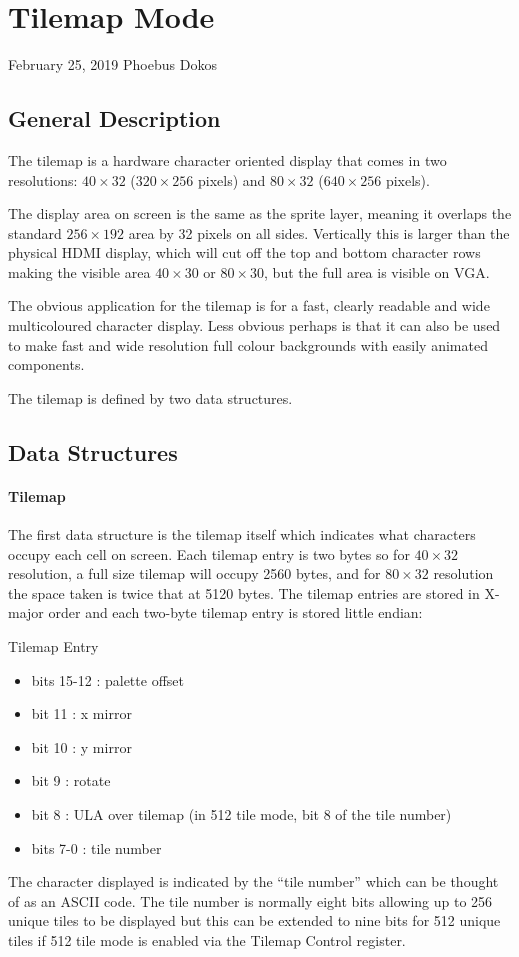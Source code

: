 \section{Tilemap Mode}

February 25, 2019 Phoebus Dokos

\subsection{General Description}
The tilemap is a hardware character oriented display that comes in two
resolutions: $40\times32$ ($320\times256$ pixels) and $80\times32$
($640\times256$ pixels).

The display area on screen is the same as the sprite layer, meaning it
overlaps the standard $256\times192$ area by 32 pixels on all
sides. Vertically this is larger than the physical HDMI display, which
will cut off the top and bottom character rows making the visible area
$40\times30$ or $80\times30$, but the full area is visible on VGA.

The obvious application for the tilemap is for a fast, clearly
readable and wide multicoloured character display. Less obvious
perhaps is that it can also be used to make fast and wide resolution
full colour backgrounds with easily animated components.

The tilemap is defined by two data structures.

\subsection{Data Structures}

\paragraph{Tilemap}

The first data structure is the tilemap itself which indicates what
characters occupy each cell on screen. Each tilemap entry is two bytes
so for $40\times32$ resolution, a full size tilemap will occupy 2560
bytes, and for $80\times32$ resolution the space taken is twice that
at 5120 bytes. The tilemap entries are stored in X-major order and
each two-byte tilemap entry is stored little endian:

Tilemap Entry
\begin{itemize}
\item[] bits 15-12 : palette offset
\item[] bit 11 : x mirror
\item[] bit 10 : y mirror
\item[] bit 9 : rotate
\item[] bit 8 : ULA over tilemap (in 512 tile mode, bit 8 of the tile
  number)
\item[] bits 7-0 : tile number
\end{itemize}
The character displayed is indicated by the “tile number” which can be
thought of as an ASCII code. The tile number is normally eight bits
allowing up to 256 unique tiles to be displayed but this can be
extended to nine bits for 512 unique tiles if 512 tile mode is enabled
via the Tilemap Control register.

